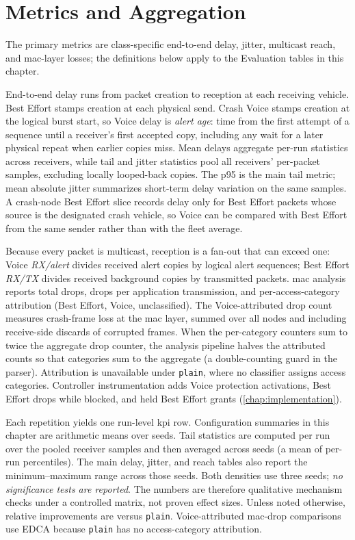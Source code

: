 \section{Metrics and Aggregation}
\label{sec:eval:metrics}

The primary metrics are class-specific end-to-end delay, jitter, multicast reach, and \gls{mac}-layer losses; the definitions below apply to the Evaluation tables in this chapter.

End-to-end delay runs from packet creation to reception at each receiving vehicle.
Best Effort stamps creation at each physical send.
Crash Voice stamps creation at the logical burst start, so Voice delay is \emph{alert age}: time from the first attempt of a sequence until a receiver's first accepted copy, including any wait for a later physical repeat when earlier copies miss.
Mean delays aggregate per-run statistics across receivers, while tail and jitter statistics pool all receivers' per-packet samples, excluding locally looped-back copies.
The \gls{p95} is the main tail metric; mean absolute jitter summarizes short-term delay variation on the same samples.
A crash-node Best Effort slice records delay only for Best Effort packets whose source is the designated crash vehicle, so Voice can be compared with Best Effort from the same sender rather than with the fleet average.

Because every packet is multicast, reception is a fan-out that can exceed one:
Voice \emph{RX/alert} divides received alert copies by logical alert sequences;
Best Effort \emph{RX/TX} divides received background copies by transmitted packets.
\gls{mac} analysis reports total drops, drops per application transmission, and per-access-category attribution (Best Effort, Voice, unclassified).
The Voice-attributed drop count measures crash-frame loss at the \gls{mac} layer, summed over all nodes and including receive-side discards of corrupted frames.
When the per-category counters sum to twice the aggregate drop counter, the analysis pipeline halves the attributed counts so that categories sum to the aggregate (a double-counting guard in the parser).
Attribution is unavailable under \texttt{plain}, where no classifier assigns access categories.
Controller instrumentation adds Voice protection activations, Best Effort drops while blocked, and held Best Effort grants (\autoref{chap:implementation}).

Each repetition yields one run-level \gls{kpi} row.
Configuration summaries in this chapter are arithmetic means over seeds.
Tail statistics are computed per run over the pooled receiver samples and then averaged across seeds (a mean of per-run percentiles).
The main delay, jitter, and reach tables also report the minimum--maximum range across those seeds.
Both densities use three seeds; \emph{no significance tests are reported}.
The numbers are therefore qualitative mechanism checks under a controlled matrix, not proven effect sizes.
Unless noted otherwise, relative improvements are versus \texttt{plain}.
Voice-attributed \gls{mac}-drop comparisons use EDCA because \texttt{plain} has no access-category attribution.

